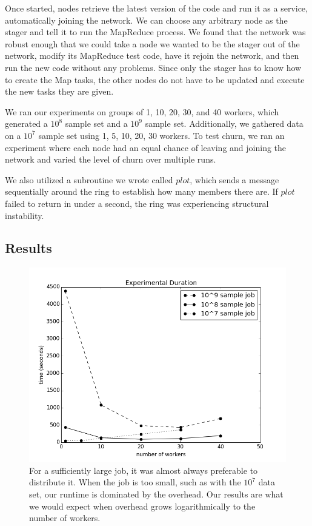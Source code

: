 Once started, nodes retrieve the latest version of the code and run it as a service, automatically joining the network.  We can choose any arbitrary node as the stager and tell it to run the MapReduce process. We found that the network was robust enough that we could take a node we wanted to be the stager out of the network, modify its MapReduce test code, have it rejoin the network, and then run the new code without any problems. Since only the stager has to know how to create the Map tasks, the other nodes do not have to be updated and execute the new tasks they are given.

We ran our experiments on groups of 1, 10, 20, 30, and 40 workers, which generated a $10^{8}$ sample set and a $10^{9}$ sample set.  Additionally, we gathered data on a $10^{7}$ sample set using 1, 5, 10, 20, 30 workers.  To test churn, we ran an experiment where each node had an equal chance of leaving and joining the network and varied the level of churn over multiple runs.  

We also utilized a subroutine we wrote called $plot$, which sends a message sequentially around the ring to establish how many members there are.  If $plot$ failed to return in under a second, the ring was experiencing structural instability.

\subsection{Results}

\begin{figure}
	\includegraphics[width=\linewidth]{figs/expTime}
	\caption{For a sufficiently large job, it was almost always preferable to distribute it.  When the job is too small, such as with the $10^{7}$ data set, our runtime is dominated by the overhead.  Our results are what we would expect when overhead grows logarithmically to the number of workers.}
	\label{fig:expTime}
\end{figure}


